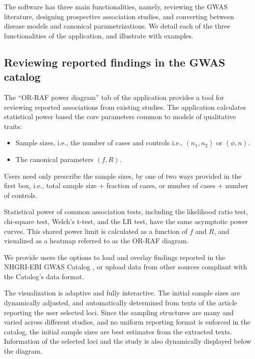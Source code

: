 
The software has three main functionalities, namely, reviewing the GWAS literature, designing prospective association studies, and converting between disease models and canonical parametrizations.
We detail each of the three functionalities of the application, and illustrate with examples.

\subsection{Reviewing reported findings in the GWAS catalog}
\label{sec:review-GWAS-studies}

The ``OR-RAF power diagram'' tab of the application provides a tool for reviewing reported associations from existing studies.
The application calculates statistical power based the core parameters common to models of qualitative traits:

\begin{itemize}
    \item Sample sizes, i.e., the number of cases and controls i.e., $(n_1, n_2)$ or $(\phi, n)$.
    \item The canonical parameters $(f, R)$.
\end{itemize}

Users need only prescribe the sample sizes, by one of two ways provided in the first box, i.e., total sample size + fraction of cases, or number of cases + number of controls.

Statistical power of common association tests, including the likelihood ratio test, chi-square test, Welch's t-test, and the LR test, have the same asymptotic power curves.
This shared power limit is calculated as a function of $f$ and $R$, and visualized as a heatmap referred to as the OR-RAF diagram. 


\bigskip

We provide users the options to load and overlay findings reported in the NHGRI-EBI GWAS Catalog \citep{macarthur2016new}, or upload data from other sources compliant with the Catalog's data format.

The visualization is adaptive and fully interactive.
The initial sample sizes are dynamically adjusted, and automatically determined from texts of the article reporting the user selected loci.
Since the sampling structures are many and varied across different studies, and no uniform reporting format is enforced in the catalog, the initial sample sizes are best estimates from the extracted texts.
Information of the selected loci and the study is also dynamically displayed below the diagram.


